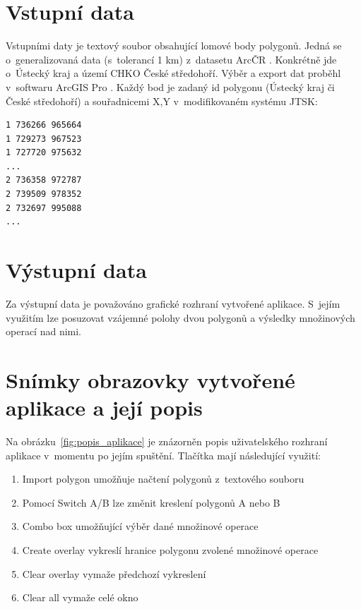 \documentclass[a4paper, 12pt, oneside, titlepage]{article} %
\begin{document}
\section{Vstupní data}
Vstupními daty je textový soubor obsahující lomové body polygonů. Jedná se o~generalizovaná data (s~tolerancí 1 km) z~datasetu ArcČR \cite{arccr}. Konkrétně jde o~Ústecký kraj a území CHKO České středohoří. Výběr a export dat proběhl v~softwaru ArcGIS Pro \cite{arcgispro}. Každý bod je zadaný id polygonu (Ústecký kraj či České středohoří) a souřadnicemi X,Y v~modifikovaném systému JTSK:

\begin{verbatim}
1 736266 965664
1 729273 967523
1 727720 975632
...
2 736358 972787
2 739509 978352
2 732697 995088
...
\end{verbatim}



\section{Výstupní data}
Za výstupní data je považováno grafické rozhraní vytvořené aplikace. S~jejím využitím lze posuzovat vzájemné polohy dvou polygonů a výsledky množinových operací nad nimi.


\section{Snímky obrazovky vytvořené aplikace a její popis}\label{snimky}
Na obrázku~\ref{fig:popis_aplikace} je znázorněn popis uživatelského rozhraní aplikace v~momentu po jejím spuštění. Tlačítka mají následující využití:

\begin{enumerate}
\item Import polygon umožňuje načtení polygonů z~textového souboru
\item Pomocí Switch A/B lze změnit kreslení polygonů A nebo B
\item Combo box umožňující výběr dané množinové operace
\item Create overlay vykreslí hranice polygonu zvolené množinové operace
\item Clear overlay vymaže předchozí vykreslení
\item Clear all vymaže celé okno
\end{enumerate}
\end{document}
